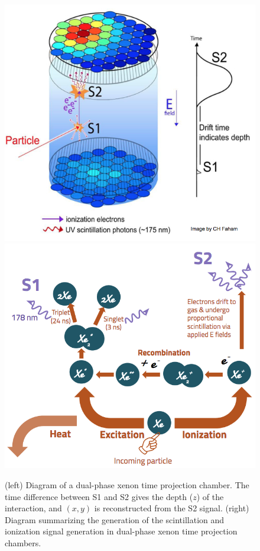 \begin{figure}[htbp]
\begin{center}
\includegraphics[width=\halffig]{figures/lxetpcs/TPC.png}
\includegraphics[width=\halffig]{figures/lxetpcs/signal_generation_in_lxe_tpcs.png}
\caption{ (left) Diagram of a dual-phase xenon time projection chamber. The time difference between S1 and S2 gives the depth ($z$) of the interaction, and $(x,y)$ is reconstructed from the S2 signal. (right) Diagram summarizing the generation of the scintillation and ionization signal generation in dual-phase xenon time projection chambers.}
\label{fig:tpc}
\end{center}
\end{figure}



